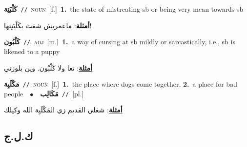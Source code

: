 \documentclass[10pt,a4paper,twoside]{article} %
\begin{document}
\begin{multicols}{2}
{\setlength\topsep{0pt}\textbf{\foreignlanguage{arabic}{كَلْبَنِة}}\ {\color{gray}\texttt{//}\color{black}}\ \textsc{noun}\ [f.]\ \textbf{1.}~the state of mistreating sb or being very mean towards sb\  \begin{flushright}\color{gray}\foreignlanguage{arabic}{\textbf{\underline{\foreignlanguage{arabic}{أمثلة}}}: ماعمريش شفت بكَلْبَنِتها!}\end{flushright}\color{black}} \vspace{2mm}

{\setlength\topsep{0pt}\textbf{\foreignlanguage{arabic}{كَلْبُون}}\ {\color{gray}\texttt{//}\color{black}}\ \textsc{adj}\ [m.]\ \textbf{1.}~a way of cursing at sb mildly or sarcastically, i.e., sb is likened to a puppy\  \begin{flushright}\color{gray}\foreignlanguage{arabic}{\textbf{\underline{\foreignlanguage{arabic}{أمثلة}}}: تعا ولا كَلْبْون. وين بلوزتي}\end{flushright}\color{black}} \vspace{2mm}

{\setlength\topsep{0pt}\textbf{\foreignlanguage{arabic}{مَكْلَبِة}}\ {\color{gray}\texttt{//}\color{black}}\ \textsc{noun}\ [f.]\ \textbf{1.}~the place where dogs come together.  \textbf{2.}~a place for bad people\ \ $\bullet$\ \ \setlength\topsep{0pt}\textbf{\foreignlanguage{arabic}{مَكَالِب}}\ {\color{gray}\texttt{//}\color{black}}\ [pl.]\  \begin{flushright}\color{gray}\foreignlanguage{arabic}{\textbf{\underline{\foreignlanguage{arabic}{أمثلة}}}: شغلي القديم زي المَكْلَبِة الله وكيلك}\end{flushright}\color{black}} \vspace{2mm}

\vspace{-3mm}
\subsection*{\color{blue}\foreignlanguage{arabic}{ك.ل.ج}\color{blue}{}} 


\end{multicols}
\end{document}
